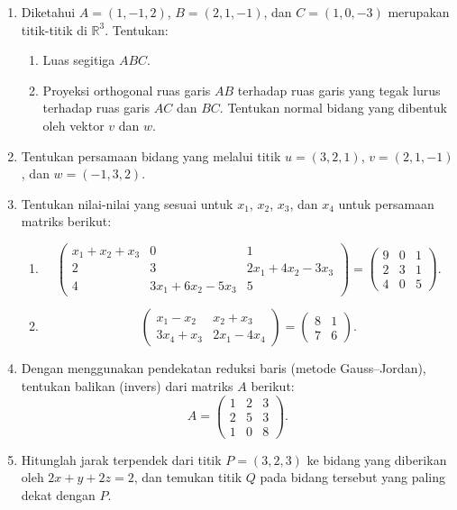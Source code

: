 \documentclass[11pt,a4paper]{article}
\begin{document}
\begin{enumerate}
    \item Diketahui $A=(1,-1,2)$, $B=(2,1,-1)$, dan $C=(1,0,-3)$
    merupakan titik-titik di $\mathbb{R}^3$. Tentukan:
    \begin{enumerate}
        \item Luas segitiga $ABC$.
        \item Proyeksi orthogonal ruas garis $AB$ terhadap ruas garis yang
        tegak lurus terhadap ruas garis $AC$ dan $BC$. Tentukan normal
        bidang yang dibentuk oleh vektor $v$ dan $w$.
    \end{enumerate}

    \item Tentukan persamaan bidang yang melalui titik $u=(3,2,1)$,
    $v=(2,1,-1)$, dan $w=(-1,3,2)$.

    \item Tentukan nilai-nilai yang sesuai untuk $x_1$, $x_2$, $x_3$, dan
    $x_4$ untuk persamaan matriks berikut:
    \begin{enumerate}
        \item
        \[
        \begin{pmatrix}
            x_1+x_2+x_3 & 0 & 1 \\
            2 & 3 & 2x_1+4x_2-3x_3 \\
            4 & 3x_1+6x_2-5x_3 & 5
        \end{pmatrix}
        =
        \begin{pmatrix}
            9 & 0 & 1 \\
            2 & 3 & 1 \\
            4 & 0 & 5
        \end{pmatrix}.
        \]
        \item
        \[
        \begin{pmatrix}
            x_1-x_2 & x_2+x_3 \\
            3x_4+x_3 & 2x_1-4x_4
        \end{pmatrix}
        =
        \begin{pmatrix}
            8 & 1 \\
            7 & 6
        \end{pmatrix}.
        \]
    \end{enumerate}

    \item Dengan menggunakan pendekatan reduksi baris (metode
    Gauss--Jordan), tentukan balikan (invers) dari matriks $A$ berikut:
    \[
    A=\begin{pmatrix}
        1 & 2 & 3 \\
        2 & 5 & 3 \\
        1 & 0 & 8
    \end{pmatrix}.
    \]

    \item Hitunglah jarak terpendek dari titik $P=(3,2,3)$ ke bidang yang
    diberikan oleh $2x+y+2z=2$, dan temukan titik $Q$ pada bidang tersebut
    yang paling dekat dengan $P$.
\end{enumerate}
\end{document}
